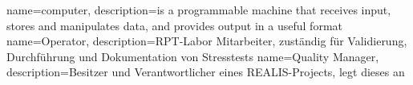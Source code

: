 {
    name=computer,
    description={is a programmable machine that receives input,
                stores and manipulates data, and provides
                output in a useful format}
}
{
    name=Operator,
    description={RPT-Labor Mitarbeiter, zuständig für Validierung, Durchführung und Dokumentation von Stresstests}
}
{
    name=Quality Manager,
    description={Besitzer und Verantwortlicher eines REALIS-Projects, legt dieses an}
}